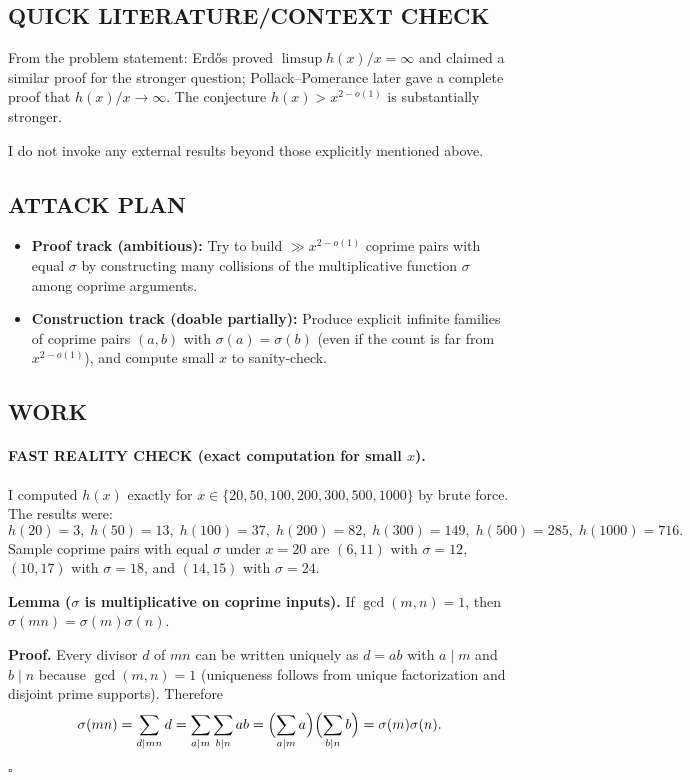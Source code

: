\subsection*{QUICK LITERATURE/CONTEXT CHECK}
From the problem statement: Erd\H{o}s proved $\limsup h(x)/x=\infty$ and claimed a similar proof for the stronger question; Pollack--Pomerance later gave a complete proof that $h(x)/x\to\infty$. The conjecture $h(x)>x^{2-o(1)}$ is substantially stronger.

I do not invoke any external results beyond those explicitly mentioned above.

\subsection*{ATTACK PLAN}
\begin{itemize}
\item \textbf{Proof track (ambitious):} Try to build $\gg x^{2-o(1)}$ coprime pairs with equal $\sigma$ by constructing many collisions of the multiplicative function $\sigma$ among coprime arguments.
\item \textbf{Construction track (doable partially):} Produce explicit infinite families of coprime pairs $(a,b)$ with $\sigma(a)=\sigma(b)$ (even if the count is far from $x^{2-o(1)}$), and compute small $x$ to sanity-check.
\end{itemize}

\subsection*{WORK}
\paragraph{FAST REALITY CHECK (exact computation for small $x$).}
I computed $h(x)$ exactly for $x\in\{20,50,100,200,300,500,1000\}$ by brute force. The results were:
\[
 h(20)=3,\; h(50)=13,\; h(100)=37,\; h(200)=82,\; h(300)=149,\; h(500)=285,\; h(1000)=716.
\]
Sample coprime pairs with equal $\sigma$ under $x=20$ are $(6,11)$ with $\sigma=12$, $(10,17)$ with $\sigma=18$, and $(14,15)$ with $\sigma=24$.

\noindent\textbf{Lemma ($\sigma$ is multiplicative on coprime inputs).}
If $\gcd(m,n)=1$, then $\sigma(mn)=\sigma(m)\sigma(n)$.

\noindent\textbf{Proof.}
Every divisor $d$ of $mn$ can be written uniquely as $d=ab$ with $a\mid m$ and $b\mid n$ because $\gcd(m,n)=1$ (uniqueness follows from unique factorization and disjoint prime supports). Therefore
\[
\sigma(mn)=\sum_{d\mid mn} d = \sum_{a\mid m}\sum_{b\mid n} ab = \Bigl(\sum_{a\mid m} a\Bigr)\Bigl(\sum_{b\mid n} b\Bigr)=\sigma(m)\sigma(n).
\]
\hfill$\square$


